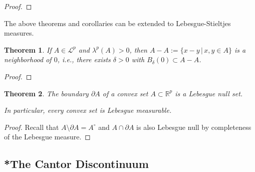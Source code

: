 \documentclass[11pt, a4paper, openany]{book}
\newtheorem{thm}{Theorem}\newtheorem{lem}{Lemma}\newtheorem{crl}{Corollary}
\theoremstyle{definition}
\begin{document}
    \begin{proof}
        
    \end{proof}
    The above theorems and corollaries can be extended to Lebesgue-Stieltjes measures.
    \begin{thm}
        If $A\in\mathscr{L}^p$ and $\lambda^p(A)>0$, then $A-A:=\{x-y\,|\,x,y\in A\}$ is a neighborhood of $0$, i.e., there exists $\delta>0$ with $B_\delta(0)\subset A-A$.
    \end{thm}
    \begin{proof}
        
    \end{proof}
    \begin{thm}
        The boundary $\partial A$ of a convex set $A\subset \mathbb{R}^p$ is a Lebesgue null set. 
        
        In particular, every convex set is Lebesgue measurable.
    \end{thm}
    \begin{proof}
        Recall that $A\setminus\partial A=A^\circ$ and $A\cap \partial A$ is also Lebesgue null by completeness of the Lebesgue measure.
    \end{proof}
\subsection{*The Cantor Discontinuum}
\end{document}
